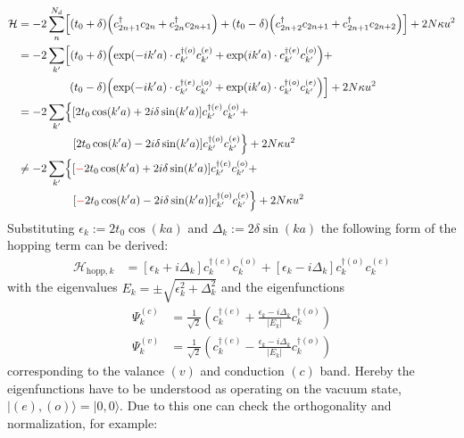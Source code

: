 \begin{align}
	\mathcal{H} &= -2\sum_n^{N_d} \left[\left(t_0+\delta\right)\left(c_{2n+1}^\dagger c_{2n} + c_{2n}^\dagger c_{2n+1} \right) + 
	\left(t_0-\delta\right)\left(c_{2n+2}^\dagger c_{2n+1} + c_{2n+1}^\dagger c_{2n+2}\right)\right]+2N\kappa u^2\\
	&= -2\sum_{k'} \left[\left(t_0+\delta\right)\left(\exp\left(-ik'a\right) \cdot c_{k'}^{\dagger(o)}c_{k'}^{(e)} + \exp\left(ik'a\right)\cdot c_{k'}^{\dagger(e)}c_{k'}^{(o)}\right)+ \right.\nonumber\\
	&\hspace*{1.6cm}\left.\left(t_0-\delta\right)\left(\exp\left(-ik'a\right)\cdot  c_{k'}^{\dagger(e)}c_{k'}^{(o)}+\exp\left(ik'a\right)\cdot  c_{k'}^{\dagger(o)}c_{k'}^{(e)}\right)\right]+2N\kappa u^2\\
	&= -2\sum_{k'} \left\{\left[2t_0\cos(k'a) + 2i\delta\sin(k'a)\right]c_{k'}^{\dagger(e)}c_{k'}^{(o)} + \right.\nonumber\\
	&\hspace*{1.7cm}\left. \left[2t_0\cos(k'a)-2i\delta\sin(k'a)\right] c_{k'}^{\dagger(o)}c_{k'}^{(e)}\right\}+2N\kappa u^2\\
	&\neq-2\sum_{k'} \left\{\left[\textcolor{red}{-}2t_0\cos(k'a) + 2i\delta\sin(k'a)\right]c_{k'}^{\dagger(e)}c_{k'}^{(o)} + \right.\nonumber\\
	&\hspace*{1.7cm}\left. \left[\textcolor{red}{-}2t_0\cos(k'a)-2i\delta\sin(k'a)\right] c_{k'}^{\dagger(o)}c_{k'}^{(e)}\right\}+2N\kappa u^2
\end{align}
Substituting $\epsilon_k := 2t_0\cos(ka)$ and $\Delta_k := 2\delta\sin(ka)$ the following form of the hopping term can be derived:
\begin{align}
	\mathcal{H}_{\text{hopp},k} &=
	\left[\epsilon_k + i\Delta_k\right]c_{k}^{\dagger(e)}c_{k}^{(o)} + \left[\epsilon_k-i\Delta_k \right]	c_{k}^{\dagger(o)}c_{k}^{(e)}
\end{align}
with the eigenvalues $E_k = \pm \sqrt{\epsilon_k^2+\Delta_k^2}$ and the eigenfunctions
\begin{align}
	\Psi_k^{(c)} &= \frac{1}{\sqrt{2}}\left(c_k^{\dagger(e)}+\frac{\epsilon_k - i \Delta_k}{|E_k|}c_{k}^{\dagger(o)}\right)\\
	\Psi_k^{(v)} &= \frac{1}{\sqrt{2}}\left(c_k^{\dagger(e)}-\frac{\epsilon_k - i \Delta_k}{|E_k|}c_{k}^{\dagger(o)}\right)
\end{align}
corresponding to the valance $(v)$ and conduction $(c)$ band. Hereby the eigenfunctions have to be understood as operating on the vacuum state, $|(e),(o)\rangle = |0,0\rangle$. Due to this one can check the orthogonality and normalization, for example:
